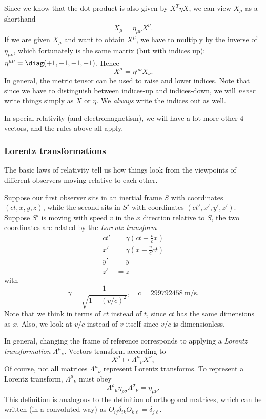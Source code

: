 \documentclass[a4paper]{article}
\begin{document}
Since we know that the dot product is also given by $X^T\eta X$, we can view $X_\mu$ as a shorthand
\[
  X_\mu = \eta_{\mu\nu}X^\nu.
\]
If we are given $X_\mu$ and want to obtain $X^\mu$, we have to multiply by the inverse of $\eta_{\mu\nu}$, which fortunately is the same matrix (but with indices up): $\eta^{\mu\nu} = \diag(+1, -1, -1, -1)$. Hence
\[
  X^\mu = \eta^{\mu\nu}X_\nu.
\]
In general, the metric tensor can be used to raise and lower indices. Note that since we have to distinguish between indices-up and indices-down, we will \emph{never} write things simply as $X$ or $\eta$. We \emph{always} write the indices out as well.

In special relativity (and electromagnetism), we will have a lot more other 4-vectors, and the rules above all apply.

\subsubsection{Lorentz transformations}
The basic laws of relativity tell us how things look from the viewpoints of different observers moving relative to each other.

Suppose our first observer sits in an inertial frame $S$ with coordinates $(ct, x, y, z)$, while the second sits in $S'$ with coordinates $(ct', x', y', z')$. Suppose $S'$ is moving with speed $v$ in the $x$ direction relative to $S$, the two coordinates are related by the \emph{Lorentz transform}
\begin{align*}
  ct' &= \gamma\left(ct - \frac{v}{c}x\right)\\
  x' &= \gamma\left(x - \frac{v}{c}ct\right)\\
  y' &= y\\
  z' &= z
\end{align*}
with
\[
  \gamma = \frac{1}{\sqrt{1 - (v/c)^2}},\quad c = \SI{299792458}{\meter\per\second}.
\]
Note that we think in terms of $ct$ instead of $t$, since $ct$ has the same dimensions as $x$. Also, we look at $v/c$ instead of $v$ itself since $v/c$ is dimensionless.

In general, changing the frame of reference corresponds to applying a \emph{Lorentz transformation} $\Lambda^\mu\!_\nu$. Vectors transform according to
\[
  X^\mu \mapsto \Lambda^\mu\!_\nu X^\nu,
\]
Of course, not all matrices $\Lambda^\mu\!_\nu$ represent Lorentz transforms. To represent a Lorentz transform, $\Lambda^\mu\!_\nu$ must obey
\[
  \Lambda^\rho\!_\mu \eta_{\rho\sigma}\Lambda^\sigma\!_\nu = \eta_{\mu\nu}.
\]
This definition is analogous to the definition of orthogonal matrices, which can be written (in a convoluted way) as $O_{ij}\delta_{ik}O_{k\ell} = \delta_{j\ell}$.
\end{document}
